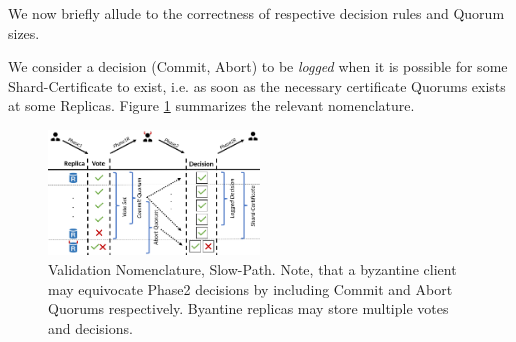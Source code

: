 \fi

We now briefly allude to the correctness of respective decision rules and Quorum sizes.



We consider a decision (Commit, Abort) to be \textit{logged} when it is possible for some Shard-Certificate to exist, i.e. as soon as the necessary certificate Quorums exists at some Replicas.
Figure \ref{fig:FigureSP} summarizes the relevant nomenclature.

\begin{figure}
\begin{center}
\includegraphics[width= 0.5\textwidth]{./figures/Nom2.png}
\end{center}
\caption{Validation Nomenclature, Slow-Path. Note, that a byzantine client may equivocate Phase2 decisions by including Commit and Abort Quorums respectively. Byantine replicas may store multiple votes and decisions.}
\label{fig:FigureSP}
\end{figure}

